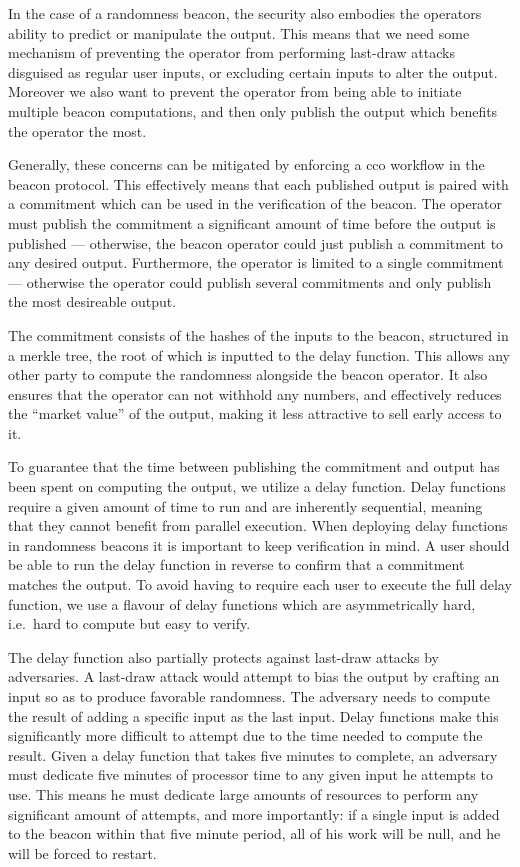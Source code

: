 In the case of a randomness beacon, the security also embodies the operators ability to predict or manipulate the output.
This means that we need some mechanism of preventing the operator from performing last-draw attacks disguised as regular user inputs, or excluding certain inputs to alter the output.
Moreover we also want to prevent the operator from being able to initiate multiple beacon computations, and then only publish the output which benefits the operator the most.

Generally, these concerns can be mitigated by enforcing a \gls{cco} workflow in the beacon protocol.
This effectively means that each published output is paired with a commitment which can be used in the verification of the beacon.
The operator must publish the commitment a significant amount of time before the output is published --- otherwise, the beacon operator could just publish a commitment to any desired output. Furthermore, the operator is limited to a single commitment --- otherwise the operator could publish several commitments and only publish the most desireable output.

The commitment consists of the hashes of the inputs to the beacon, structured in a merkle tree, the root of which is inputted to the delay function. This allows any other party to compute the randomness alongside the beacon operator. It also ensures that the operator can not withhold any numbers, and effectively reduces the \enquote{market value} of the output, making it less attractive to sell early access to it.

To guarantee that the time between publishing the commitment and output has been spent on computing the output, we utilize a delay function.
Delay functions require a given amount of time to run and are inherently sequential, meaning that they cannot benefit from parallel execution.
When deploying delay functions in randomness beacons it is important to keep verification in mind.
A user should be able to run the delay function in reverse to confirm that a commitment matches the output.
To avoid having to require each user to execute the full delay function, we use a flavour of delay functions which are asymmetrically hard, i.e.\ hard to compute but easy to verify.

The delay function also partially protects against last-draw attacks by adversaries. A last-draw attack would attempt to bias the output by crafting an input so as to produce favorable randomness. The adversary needs to compute the result of adding a specific input as the last input. Delay functions make this significantly more difficult to attempt due to the time needed to compute the result.
Given a delay function that takes five minutes to complete, an adversary must dedicate five minutes of processor time to any given input he attempts to use. This means he must dedicate large amounts of resources to perform any significant amount of attempts, and more importantly: if a single input is added to the beacon within that five minute period, all of his work will be null, and he will be forced to restart.

